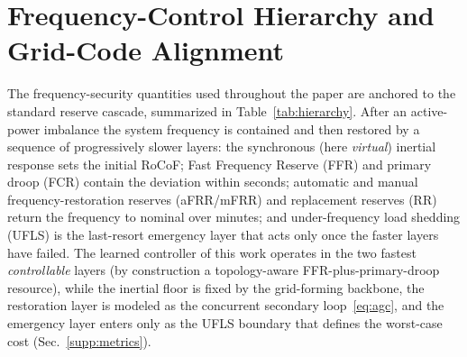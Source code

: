 \documentclass[lettersize,journal]{IEEEtran}
\begin{document}
\section{Frequency-Control Hierarchy and Grid-Code Alignment}
\label{supp:hierarchy}
The frequency-security quantities used throughout the paper are anchored to the standard reserve cascade, summarized in Table~\ref{tab:hierarchy}. After an active-power imbalance the system frequency is contained and then restored by a sequence of progressively slower layers: the synchronous (here \emph{virtual}) inertial response sets the initial RoCoF; Fast Frequency Reserve (FFR) and primary droop (FCR) contain the deviation within seconds; automatic and manual frequency-restoration reserves (aFRR/mFRR) and replacement reserves (RR) return the frequency to nominal over minutes; and under-frequency load shedding (UFLS) is the last-resort emergency layer that acts only once the faster layers have failed. The learned controller of this work operates in the two fastest \emph{controllable} layers (by construction a topology-aware FFR-plus-primary-droop resource), while the inertial floor is fixed by the grid-forming backbone, the restoration layer is modeled as the concurrent secondary loop~\eqref{eq:agc}, and the emergency layer enters only as the UFLS boundary that defines the worst-case cost (Sec.~\ref{supp:metrics}).
\end{document}
